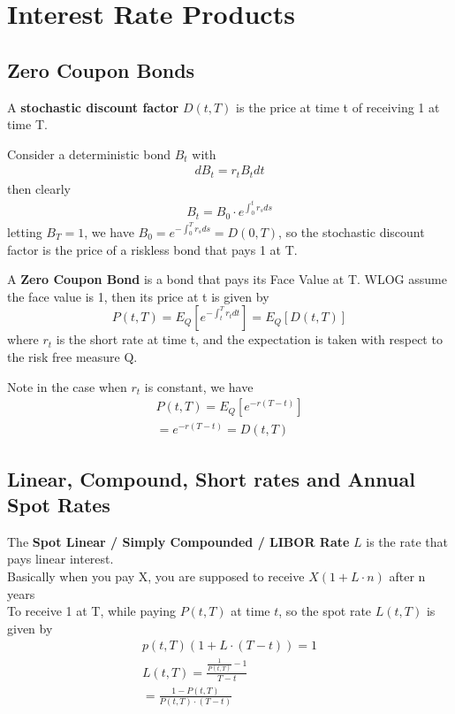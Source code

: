 \section{Interest Rate Products}
\subsection{Zero Coupon Bonds}
\begin{definition}
    A \textbf{stochastic discount factor} $D(t, T)$ is the price at time t of receiving 1 at time T.

    Consider a deterministic bond $B_t$ with 
    \begin{align*}
        dB_t = r_t B_t dt
    \end{align*}
    then clearly
    \begin{align*}
        B_t = B_0 \cdot e^{\int_{0}^{t} r_s ds} 
    \end{align*}
    letting $B_T = 1$, we have $ B_0 = e^{-\int_{0}^{T} r_s ds} = D(0, T)$, so the stochastic discount factor is the price of a riskless bond that pays 1 at T.
\end{definition}
\begin{definition}
    A \textbf{Zero Coupon Bond} is a bond that pays its Face Value at T. 
    WLOG assume the face value is 1, then its price at t is given by
    \begin{equation}
        P(t, T) = E_Q\left[ e^{-\int_{t}^{T} r_t dt }\right] = E_Q\left[ D(t, T) \right]
        \label{eq:zcb}
    \end{equation}
    where $r_t$ is the short rate at time t, and the expectation is taken with respect to the risk free measure Q.

    Note in the case when $r_t$ is constant, we have
    \begin{align*}
        P(t, T) = E_Q\left[ e^{-r(T - t)} \right] \\
        = e^{-r(T - t)} = D(t, T)
    \end{align*}
\end{definition}

\subsection{Linear, Compound, Short rates and Annual Spot Rates}
\begin{definition}
    The \textbf{Spot Linear / Simply Compounded / LIBOR Rate} $L$ is the rate that pays linear interest. \\
    Basically when you pay X, you are supposed to receive $X(1 + L \cdot n)$ after n years \\
    To receive 1 at T, while paying $P(t, T)$ at time $t$, so the spot rate $L(t, T)$ is given by
    \begin{align*}
        p(t, T) (1 + L \cdot (T - t)) = 1 \\
        L(t, T) = \frac{\frac{1}{P(t, T)} - 1}{T - t} \\
        = \frac{1 - P(t, T)}{P(t, T) \cdot (T - t)}
    \end{align*}

\end{definition}

